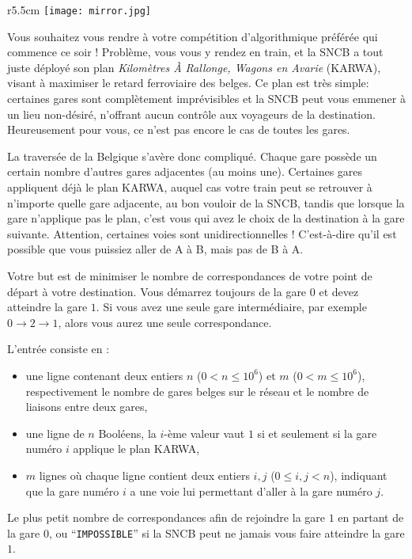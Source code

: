 \problemname{\problemyamlname}

\begin{wrapfigure}{r}{5.5cm}
    \centering
    \texttt{[image: mirror.jpg]}
\end{wrapfigure}

Vous souhaitez vous rendre à votre compétition d'algorithmique préférée qui commence ce soir ! Problème, vous vous y rendez en train, et la SNCB a tout juste déployé son plan \emph{Kilomètres À Rallonge, Wagons en Avarie} (KARWA), visant à maximiser le retard ferroviaire des belges. Ce plan est très simple: certaines gares sont complètement imprévisibles et la SNCB peut vous emmener à un lieu non-désiré, n'offrant aucun contrôle aux voyageurs de la destination. Heureusement pour vous, ce n'est pas encore le cas de toutes les gares.

La traversée de la Belgique s'avère donc compliqué. Chaque gare possède un certain nombre d'autres gares adjacentes (au moins une). Certaines gares appliquent déjà le plan KARWA, auquel cas votre train peut se retrouver à n'importe quelle gare adjacente, au bon vouloir de la SNCB, tandis que lorsque la gare n'applique pas le plan, c'est vous qui avez le choix de la destination à la gare suivante. Attention, certaines voies sont unidirectionnelles ! C'est-à-dire qu'il est possible que vous puissiez aller de A à B, mais pas de B à A.

Votre but est de minimiser le nombre de correspondances de votre point de départ à votre destination. Vous démarrez toujours de la gare $0$ et devez atteindre la gare $1$. Si vous avez une seule gare intermédiaire, par exemple $0 \rightarrow 2 \rightarrow 1$, alors vous aurez une seule correspondance.

\begin{Input}
	L'entrée consiste en :
	\begin{itemize}
		\item une ligne contenant deux entiers $n$ ($0 < n \le 10^6$) et $m$ ($0 < m \le 10^6$), respectivement le nombre de gares belges sur le réseau et le nombre de liaisons entre deux gares,
		\item une ligne de $n$ Booléens, la $i$-ème valeur vaut $1$ si et seulement si la gare numéro $i$ applique le plan KARWA,
		\item $m$ lignes où chaque ligne contient deux entiers $i, j$ ($0 \leq i,j < n$), indiquant que la gare numéro $i$ a une voie lui permettant d'aller à la gare numéro $j$.
	\end{itemize}
\end{Input}

\begin{Output}
	Le plus petit nombre de correspondances afin de rejoindre la gare $1$ en partant de la gare $0$, ou ``\texttt{IMPOSSIBLE}'' si la SNCB peut ne jamais vous faire atteindre la gare $1$.
\end{Output}
